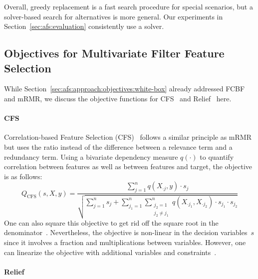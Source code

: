\documentclass{article}
\theoremstyle{definition}
\begin{document}
Overall, greedy replacement is a fast search procedure for special scenarios, but a solver-based search for alternatives is more general.
Our experiments in Section~\ref{sec:afs:evaluation} consistently use a solver.

\subsection{Objectives for Multivariate Filter Feature Selection}
\label{sec:afs:appendix:multivariate-filter-objectives}

While Section~\ref{sec:afs:approach:objectives:white-box} already addressed FCBF and mRMR, we discuss the objective functions for CFS~\cite{hall1999correlation, hall2000correlation} and Relief~\cite{kira1992feature, robnik1997adaptation} here.

\paragraph{CFS}

Correlation-based Feature Selection (CFS)~\cite{hall1999correlation, hall2000correlation} follows a similar principle as mRMR but uses the ratio instead of the difference between a relevance term and a redundancy term.
Using a bivariate dependency measure $q(\cdot)$ to quantify correlation between features as well as between features and target, the objective is as follows:
%
\begin{equation}
	Q_{\text{CFS}}(s,X,y) = \frac{\sum_{j=1}^{n} q(X_{\cdot{}j},y) \cdot s_j}{\sqrt{\sum_{j=1}^{n} s_j + \sum_{j_1=1}^{n} \sum_{\substack{j_2=1 \\ j_2 \neq j_1}}^{n} q(X_{\cdot{}j_1}, X_{\cdot{}j_2}) \cdot s_{j_1} \cdot s_{j_2}}}
	\label{eq:afs:cfs}
\end{equation}
%
One can also square this objective to get rid off the square root in the denominator~\cite{nguyen2010towards}.
Nevertheless, the objective is non-linear in the decision variables~$s$ since it involves a fraction and multiplications between variables.
However, one can linearize the objective with additional variables and constraints~\cite{nguyen2010improving, nguyen2010towards}.

\paragraph{Relief}
\end{document}
